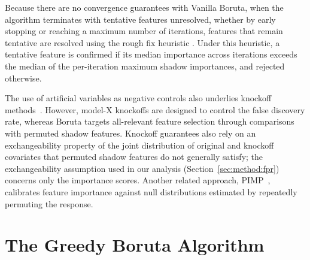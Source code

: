 \documentclass[runningheads]{llncs}
\begin{document}
Because there are no convergence guarantees with Vanilla Boruta, when the algorithm terminates with tentative features unresolved, whether by early stopping or reaching a maximum number of iterations, features that remain tentative are resolved using the rough fix heuristic \cite{kursa2010feature}. Under this heuristic, a tentative feature is confirmed if its median importance across iterations exceeds the median of the per-iteration maximum shadow importances, and rejected otherwise. 

The use of artificial variables as negative controls also underlies knockoff methods~\cite{barber2015controlling,candes2018panning}. However, model-X knockoffs are designed to control the false discovery rate, whereas Boruta targets all-relevant feature selection through comparisons with permuted shadow features. Knockoff guarantees also rely on an exchangeability property of the joint distribution of original and knockoff covariates that permuted shadow features do not generally satisfy; the exchangeability assumption used in our analysis (Section~\ref{sec:method:fpr}) concerns only the importance scores. Another related approach, PIMP~\cite{altmann2010permutation}, calibrates feature importance against null distributions estimated by repeatedly permuting the response.

\section{The Greedy Boruta Algorithm}
\label{sec:method}

\end{document}
